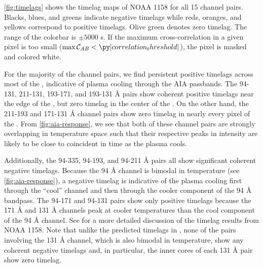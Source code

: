 \autoref{fig:timelags} shows the timelag maps of \AR{} NOAA 1158 for all 15 channel pairs. Blacks, blues, and greens indicate negative timelags while reds, oranges, and yellows correspond to positive timelags. Olive green denotes zero timelag. The range of the colorbar is $\pm5000$ s. If the maximum cross-correlation in a given pixel is too small ($\max\mathcal{C}_{AB}<\py|correlation_threshold|$), the pixel is masked and colored white.

For the majority of the channel pairs, we find persistent positive timelags across most of the \AR{}, indicative of plasma cooling through the AIA passbands. The 94-131, 211-131, 193-171, and 193-131 \AA{} pairs show coherent positive timelags near the edge of the \AR{}, but zero timelag in the center of the \AR{}. On the other hand, the 211-193 and 171-131 \AA{} channel pairs show zero timelag in nearly every pixel of the \AR{}. From \autoref{fig:aia-response}, we see that both of these channel pairs are strongly overlapping in temperature space such that their respective peaks in intensity are likely to be close to coincident in time as the plasma cools. 

Additionally, the 94-335, 94-193, and 94-211 \AA{} pairs all show significant coherent negative timelags. Because the 94 \AA{} channel is bimodal in temperature (see \autoref{fig:aia-response}), a negative timelag is indicative of the plasma cooling first through the ``cool'' channel and then through the cooler component of the 94 \AA{} bandpass. The 94-171 and 94-131 pairs show only positive timelags because the 171 \AA{} and 131 \AA{} channels peak at cooler temperatures than the cool component of the 94 \AA{} channel. See \citet{viall_survey_2017} for a more detailed discussion of the timelag results from NOAA 1158. Note that unlike the predicted timelags in , none of the pairs involving the 131 \AA{} channel, which is also bimodal in temperature, show any coherent negative timelags and, in particular, the inner cores of each 131 \AA{} pair show zero timelag.

